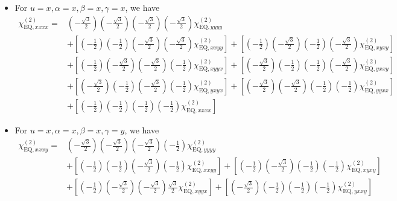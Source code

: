 \documentclass[UTF8,10pt,a4paper]{article}
\begin{document}
\begin{itemize}
\item For $u=x,\alpha=x,\beta=x,\gamma=x$, we have
\footnotesize\begin{align}
\nonumber\chi_{\text{EQ},xxxx}^{(2)}=&\left(-\frac{\sqrt{3}}{2}\right)\left(-\frac{\sqrt{3}}{2}\right)\left(-\frac{\sqrt{3}}{2}\right)\left(-\frac{\sqrt{3}}{2}\right)\chi_{\text{EQ},yyyy}^{(2)}\\
\nonumber&+\left[\left(-\frac{1}{2}\right)\left(-\frac{1}{2}\right)\left(-\frac{\sqrt{3}}{2}\right)\left(-\frac{\sqrt{3}}{2}\right)\chi_{\text{EQ},xxyy}^{(2)}\right]+\left[\left(-\frac{1}{2}\right)\left(-\frac{\sqrt{3}}{2}\right)\left(-\frac{1}{2}\right)\left(-\frac{\sqrt{3}}{2}\right)\chi_{\text{EQ},xyxy}^{(2)}\right]\\
\nonumber&+\left[\left(-\frac{1}{2}\right)\left(-\frac{\sqrt{3}}{2}\right)\left(-\frac{\sqrt{3}}{2}\right)\left(-\frac{1}{2}\right)\chi_{\text{EQ},xyyx}^{(2)}\right]+\left[\left(-\frac{\sqrt{3}}{2}\right)\left(-\frac{1}{2}\right)\left(-\frac{1}{2}\right)\left(-\frac{\sqrt{3}}{2}\right)\chi_{\text{EQ},yxxy}^{(2)}\right]\\
\nonumber&+\left[\left(-\frac{\sqrt{3}}{2}\right)\left(-\frac{1}{2}\right)\left(-\frac{\sqrt{3}}{2}\right)\left(-\frac{1}{2}\right)\chi_{\text{EQ},yxyx}^{(2)}\right]+\left[\left(-\frac{\sqrt{3}}{2}\right)\left(-\frac{\sqrt{3}}{2}\right)\left(-\frac{1}{2}\right)\left(-\frac{1}{2}\right)\chi_{\text{EQ},yyxx}^{(2)}\right]\\
&+\left[\left(-\frac{1}{2}\right)\left(-\frac{1}{2}\right)\left(-\frac{1}{2}\right)\left(-\frac{1}{2}\right)\chi_{\text{EQ},xxxx}^{(2)}\right]
\end{align}\normalsize
\item For $u=x,\alpha=x,\beta=x,\gamma=y$, we have
\footnotesize\begin{align}
\nonumber\chi_{\text{EQ},xxxy}^{(2)}=&\left(-\frac{\sqrt{3}}{2}\right)\left(-\frac{\sqrt{3}}{2}\right)\left(-\frac{\sqrt{3}}{2}\right)\left(-\frac{1}{2}\right)\chi_{\text{EQ},yyyy}^{(2)}\\
\nonumber&+\left[\left(-\frac{1}{2}\right)\left(-\frac{1}{2}\right)\left(-\frac{\sqrt{3}}{2}\right)\left(-\frac{1}{2}\right)\chi_{\text{EQ},xxyy}^{(2)}\right]+\left[\left(-\frac{1}{2}\right)\left(-\frac{\sqrt{3}}{2}\right)\left(-\frac{1}{2}\right)\left(-\frac{1}{2}\right)\chi_{\text{EQ},xyxy}^{(2)}\right]\\
\nonumber&+\left[\left(-\frac{1}{2}\right)\left(-\frac{\sqrt{3}}{2}\right)\left(-\frac{\sqrt{3}}{2}\right)\frac{\sqrt{3}}{2}\chi_{\text{EQ},xyyx}^{(2)}\right]+\left[\left(-\frac{\sqrt{3}}{2}\right)\left(-\frac{1}{2}\right)\left(-\frac{1}{2}\right)\left(-\frac{1}{2}\right)\chi_{\text{EQ},yxxy}^{(2)}\right]\\

\end{align}
\end{itemize}
\end{document}
